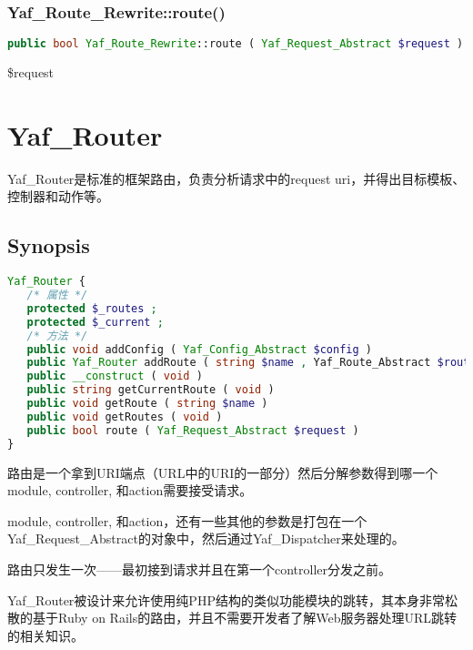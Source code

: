 \subsection{Yaf\_Route\_Rewrite::route()}







\begin{lstlisting}[language=PHP]
public bool Yaf_Route_Rewrite::route ( Yaf_Request_Abstract $request )
\end{lstlisting}

\begin{compactitem}
\item \$request
\end{compactitem}

\chapter{Yaf\_Router}

Yaf\_Router是标准的框架路由，负责分析请求中的request uri，并得出目标模板、控制器和动作等。


\section{Synopsis}

\begin{lstlisting}[language=PHP]
Yaf_Router {
   /* 属性 */
   protected $_routes ;
   protected $_current ;
   /* 方法 */
   public void addConfig ( Yaf_Config_Abstract $config )
   public Yaf_Router addRoute ( string $name , Yaf_Route_Abstract $route )
   public __construct ( void )
   public string getCurrentRoute ( void )
   public void getRoute ( string $name )
   public void getRoutes ( void )
   public bool route ( Yaf_Request_Abstract $request )
}
\end{lstlisting}

路由是一个拿到URI端点（URL中的URI的一部分）然后分解参数得到哪一个module, controller, 和action需要接受请求。

module, controller, 和action，还有一些其他的参数是打包在一个Yaf\_Request\_Abstract的对象中，然后通过Yaf\_Dispatcher来处理的。

路由只发生一次——最初接到请求并且在第一个controller分发之前。

Yaf\_Router被设计来允许使用纯PHP结构的类似功能模块的跳转，其本身非常松散的基于Ruby on Rails的路由，并且不需要开发者了解Web服务器处理URL跳转的相关知识。

